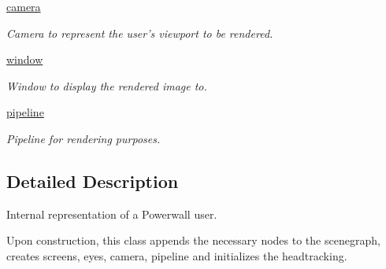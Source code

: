 \begin{DoxyCompactItemize}
\hyperlink{classlib_1_1PowerWallUser_1_1PowerWallUser_a66815b6ee53b6efee2bc599320e0e15d}{camera}
\begin{DoxyCompactList}\small\item\em \-Camera to represent the user's viewport to be rendered. \end{DoxyCompactList}\item 
\hyperlink{classlib_1_1PowerWallUser_1_1PowerWallUser_abe6b7da901a398446c6bba0d075fec75}{window}
\begin{DoxyCompactList}\small\item\em \-Window to display the rendered image to. \end{DoxyCompactList}\item 
\hyperlink{classlib_1_1PowerWallUser_1_1PowerWallUser_a9e8d3ed299af3a3e67727e066063acf0}{pipeline}
\begin{DoxyCompactList}\small\item\em \-Pipeline for rendering purposes. \end{DoxyCompactList}\end{DoxyCompactItemize}


\subsection{\-Detailed \-Description}
\-Internal representation of a \-Powerwall user. 

\-Upon construction, this class appends the necessary nodes to the scenegraph, creates screens, eyes, camera, pipeline and initializes the headtracking. 

